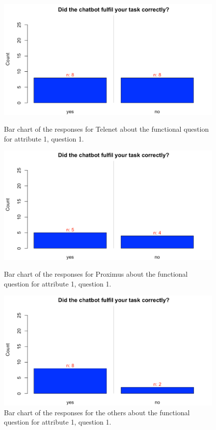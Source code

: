 \begin{figure}[!htb]
	\includegraphics[width=\linewidth]{../LaTeX/Figures/Comparative/Q1T.png}
	\caption{Bar chart of the responses for Telenet about the functional question for attribute 1, question 1.}\label{fig:Q1T}
	\endminipage\hfill
	\includegraphics[width=\linewidth]{../LaTeX/Figures/Comparative/Q1P.png}
	\caption{Bar chart of the responses for Proximus about the functional question for attribute 1, question 1.}\label{fig:Q1P}
	\endminipage\hfill
	\includegraphics[width=\linewidth]{../LaTeX/Figures/Comparative/Q1O.png}
	\caption{Bar chart of the responses for the others about the functional question for attribute 1, question 1.}\label{fig:Q1O}
	\endminipage\hfill
\end{figure}
